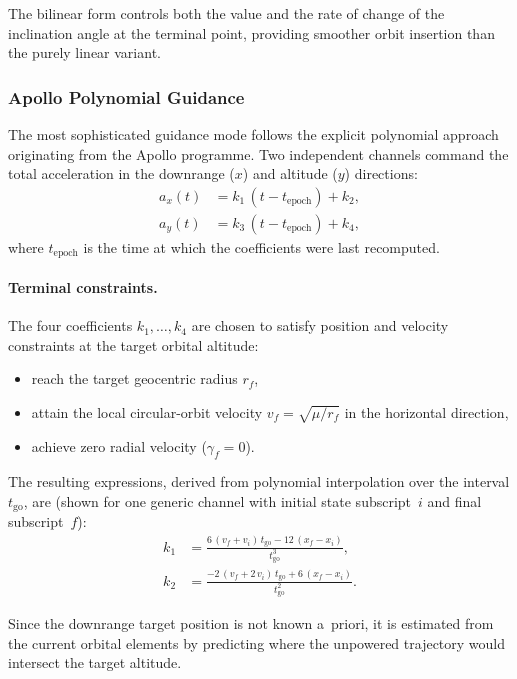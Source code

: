 The bilinear form controls both the value and the rate of change of the
inclination angle at the terminal point, providing smoother orbit insertion
than the purely linear variant.

\subsubsection{Apollo Polynomial Guidance}
\label{sssec:apollo}

The most sophisticated guidance mode follows the explicit polynomial approach
originating from the Apollo programme.  Two independent channels command the
total acceleration in the downrange ($x$) and altitude ($y$) directions:
\begin{align}
  a_x(t) &= k_1\,(t - t_{\text{epoch}}) + k_2, \label{eq:apollo_ax} \\
  a_y(t) &= k_3\,(t - t_{\text{epoch}}) + k_4, \label{eq:apollo_ay}
\end{align}
where $t_{\text{epoch}}$ is the time at which the coefficients were last
recomputed.

\paragraph{Terminal constraints.}
The four coefficients $k_1,\dots,k_4$ are chosen to satisfy position and
velocity constraints at the target orbital altitude:
\begin{itemize}
  \item reach the target geocentric radius $r_f$,
  \item attain the local circular-orbit velocity
        $v_f = \sqrt{\mu / r_f}$ in the horizontal direction,
  \item achieve zero radial velocity ($\gamma_f = 0$).
\end{itemize}

The resulting expressions, derived from polynomial interpolation over the
interval $t_{\text{go}}$, are (shown for one generic channel with initial
state subscript~$i$ and final subscript~$f$):
\begin{align}
  k_1 &= \frac{6\,(v_f + v_i)\,t_{\text{go}}
          - 12\,(x_f - x_i)}{t_{\text{go}}^3},
        \label{eq:apollo_k1} \\[4pt]
  k_2 &= \frac{-2\,(v_f + 2\,v_i)\,t_{\text{go}}
          + 6\,(x_f - x_i)}{t_{\text{go}}^2}.
        \label{eq:apollo_k2}
\end{align}

Since the downrange target position is not known a~priori, it is estimated from
the current orbital elements by predicting where the unpowered trajectory would
intersect the target altitude.

